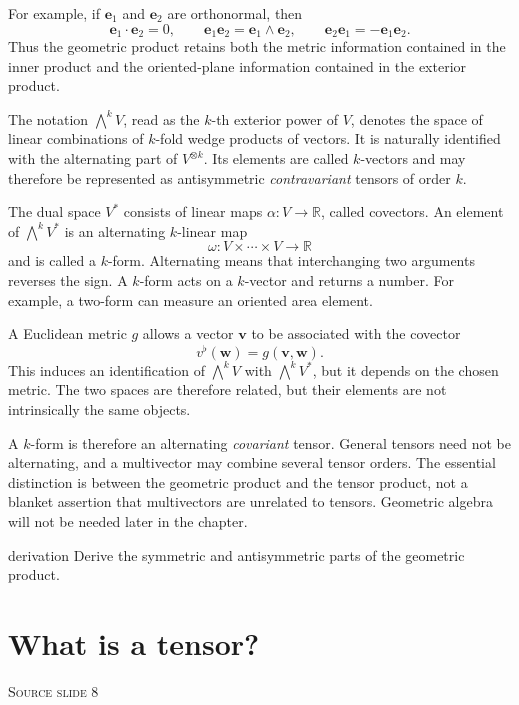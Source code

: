 \documentclass[11pt,a4paper]{article}
\newcommand{\vect}[1]{\bm{#1}}
\newcommand{\R}{\mathbb{R}}
\newcommand{\slideref}[1]{%
  \par\smallskip
  {\footnotesize\color{ink!60}\textsc{Source slide #1}}\par
}
\begin{document}
For example, if \(\vect{e}_1\) and \(\vect{e}_2\) are orthonormal, then
\[
  \vect{e}_1\cdot\vect{e}_2=0,
  \qquad
  \vect{e}_1\vect{e}_2
  =\vect{e}_1\wedge\vect{e}_2,
  \qquad
  \vect{e}_2\vect{e}_1=-\vect{e}_1\vect{e}_2.
\]
Thus the geometric product retains both the metric information contained in
the inner product and the oriented-plane information contained in the
exterior product.

\begin{precision}
The notation \(\bigwedge^k V\), read as the \(k\)-th exterior power of \(V\),
denotes the space of linear combinations of \(k\)-fold wedge products of
vectors. It is naturally identified with the alternating part of
\(V^{\otimes k}\). Its elements are called \(k\)-vectors and may therefore be
represented as antisymmetric \emph{contravariant} tensors of order \(k\).

The dual space \(V^*\) consists of linear maps \(\alpha:V\to\R\), called
covectors. An element of \(\bigwedge^kV^*\) is an alternating \(k\)-linear map
\[
  \omega:V\times\cdots\times V\longrightarrow\R
\]
and is called a \(k\)-form. Alternating means that interchanging two arguments
reverses the sign. A \(k\)-form acts on a \(k\)-vector and returns a number.
For example, a two-form can measure an oriented area element.

A Euclidean metric \(g\) allows a vector \(\vect v\) to be associated with the
covector
\[
  v^\flat(\vect w)=g(\vect v,\vect w).
\]
This induces an identification of \(\bigwedge^kV\) with \(\bigwedge^kV^*\), but it
depends on the chosen metric. The two spaces are therefore related, but their
elements are not intrinsically the same objects.

A \(k\)-form is therefore an alternating \emph{covariant} tensor. General
tensors need not be alternating, and a multivector may combine several tensor
orders. The essential distinction is between the geometric product and the
tensor product, not a blanket assertion that multivectors are unrelated to
tensors. Geometric algebra will not be needed later in the chapter.
\end{precision}

\begin{studentwork}[height=5.6cm]{derivation}
Derive the symmetric and antisymmetric parts of the geometric product.
\end{studentwork}

\section{What is a tensor?}
\slideref{8}
\end{document}
